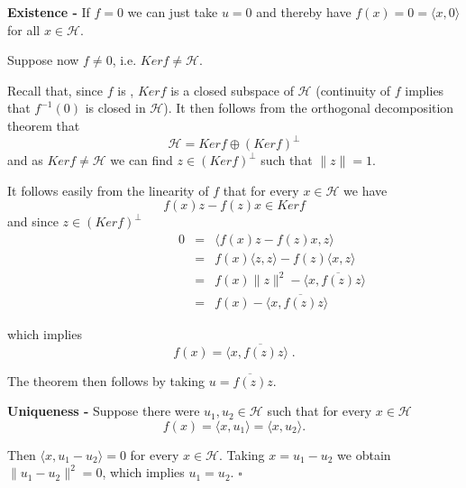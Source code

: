 \documentclass[12pt]{article}
\begin{document}
{\bf Existence -} If $f=0$ we can just take $u=0$ and thereby have $f(x) =0= \langle x, 0\rangle$ for all $x \in \mathcal{H}$.

Suppose now $f \neq 0$, i.e. $Ker f \neq \mathcal{H}$.

Recall that, since $f$ is , $Ker f$ is a closed subspace of $\mathcal{H}$ (continuity of $f$ implies that $f^{-1}(0)$ is closed in $\mathcal{H}$). It then follows from the orthogonal decomposition theorem that
\begin{displaymath}
\mathcal{H} = Ker f \oplus (Ker f)^{\perp}
\end{displaymath}
and as $Ker f \neq \mathcal{H}$ we can find $z \in (Ker f)^{\perp}$ such that $\|z\| = 1$.

It follows easily from the linearity of $f$ that for every $x \in \mathcal{H}$ we have
\begin{displaymath}
f(x)z-f(z)x \in Ker f
\end{displaymath}
and since $z \in (Ker f)^{\perp}$
\begin{eqnarray*}
\quad\quad\quad\quad\quad\quad 0 & = & \langle f(x)z -f(z)x, z \rangle \\
& = & f(x)\langle z, z\rangle - f(z)\langle x, z\rangle \\
& = & f(x)\|z\|^2 -  \langle x, \overline{f(z)} z\rangle \\
& = & f(x) -  \langle x, \overline{f(z)} z\rangle
\end{eqnarray*}

which implies
\begin{displaymath}
f(x) = \langle x, \overline{f(z)} z\rangle \; .
\end{displaymath}

The theorem then follows by taking $u = \overline{f(z)} z$.

{\bf Uniqueness -} Suppose there were $u_1, u_2 \in \mathcal{H}$ such that for every $x \in \mathcal{H}$
\begin{displaymath}
f(x)= \langle x, u_1 \rangle = \langle x, u_2 \rangle .
\end{displaymath}

Then $\langle x, u_1 -u_2 \rangle = 0$ for every $x \in \mathcal{H}$. Taking $x = u_1 - u_2$ we obtain $\|u_1-u_2\|^2 = 0$, which implies $u_1 = u_2$. $\square$
\end{document}

